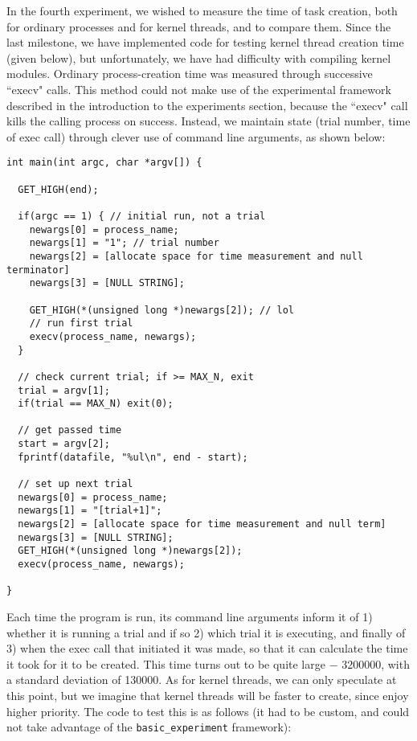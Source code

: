 In the fourth experiment, we wished to measure the time of task creation, both for ordinary processes and for kernel threads, and to compare them. Since the last milestone, we have implemented code for testing kernel thread creation time (given below), but unfortunately, we have had difficulty with compiling kernel modules. 
\newline
\newline
Ordinary process-creation time was measured through successive ``execv" calls. This method could not make use of the experimental framework described in the introduction to the experiments section, because the ``execv" call kills the calling process on success. Instead, we maintain state (trial number, time of exec call) through clever use of command line arguments, as shown below:

\noindent \begin{verbatim}
int main(int argc, char *argv[]) {

  GET_HIGH(end);

  if(argc == 1) { // initial run, not a trial
    newargs[0] = process_name;
    newargs[1] = "1"; // trial number
    newargs[2] = [allocate space for time measurement and null terminator]
    newargs[3] = [NULL STRING];

    GET_HIGH(*(unsigned long *)newargs[2]); // lol
    // run first trial
    execv(process_name, newargs);
  }

  // check current trial; if >= MAX_N, exit
  trial = argv[1];
  if(trial == MAX_N) exit(0);

  // get passed time
  start = argv[2];
  fprintf(datafile, "%ul\n", end - start);

  // set up next trial
  newargs[0] = process_name;
  newargs[1] = "[trial+1]";
  newargs[2] = [allocate space for time measurement and null term]
  newargs[3] = [NULL STRING];
  GET_HIGH(*(unsigned long *)newargs[2]);
  execv(process_name, newargs);

}
\end{verbatim}

\newpage

Each time the program is run, its command line arguments inform it of 1) whether it is running a trial and if so 2) which trial it is executing, and finally of 3) when the exec call that initiated it was made, so that it can calculate the time it took for it to be created.
\newline
\newline
This time turns out to be quite large $-$ 3200000, with a standard deviation of 130000. 
\newline
\newline
As for kernel threads, we can only speculate at this point, but we imagine that kernel threads will be faster to create, since enjoy higher priority. The code to test this is as follows (it had to be custom, and could not take advantage of the {\tt basic\_experiment} framework):

